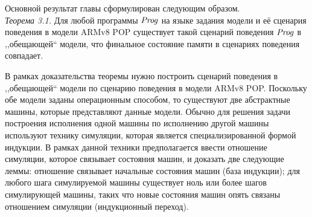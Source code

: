 Основной результат главы %
сформулирован следующим образом. \\
\emph{Теорема 3.1.} Для любой программы $\mathit{Prog}$ на языке задания модели и её сценария поведения в модели ARMv8 POP существует
такой сценарий поведения $\mathit{Prog}$ в ,,обещающей`` модели, что финальное состояние памяти в сценариях поведения совпадает.

В рамках доказательства теоремы нужно построить сценарий поведения в ,,обещающей`` модели по сценарию поведения в модели ARMv8 POP.
Поскольку обе модели заданы операционным способом, то существуют две абстрактные машины, которые представляют данные модели.
Обычно для решения задачи построения исполнения одной машины по исполнению другой машины используют технику симуляции,
которая является специализированной формой индукции. В рамках данной техники предполагается ввести  отношение симуляции,
которое связывает состояния машин, и доказать  две следующие леммы:  отношение связывает начальные состояния машин (база индукции);
для любого шага симулируемой машины существует ноль или более шагов симулирующей машины, таких что
новые состояния машин опять связаны отношением симуляции (индукционный переход).




